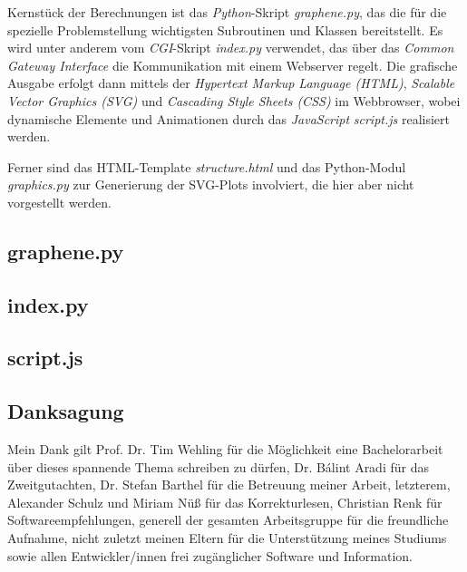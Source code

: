 \documentclass[a4paper, 10pt, twoside, openany]{book} %
\begin{document}
	Kernstück der Berechnungen ist das \emph{Python}-Skript \emph{graphene.py}, das die für die spezielle Problemstellung wichtigsten Subroutinen und Klassen bereitstellt. Es wird unter anderem vom \emph{CGI}-Skript \emph{index.py} verwendet, das über das \emph{Common Gateway Interface} die Kommunikation mit einem Webserver regelt. Die grafische Ausgabe erfolgt dann mittels der \emph{Hypertext Markup Language (HTML)}, \emph{Scalable Vector Graphics (SVG)} und \emph{Cascading Style Sheets (CSS)} im Webbrowser, wobei dynamische Elemente und Animationen durch das \emph{JavaScript} \emph{script.js} realisiert werden.
	
	Ferner sind das HTML-Template \emph{structure.html} und das Python-Modul \emph{graphics.py} zur Generierung der SVG-Plots involviert, die hier aber nicht vorgestellt werden.
	
	\section{graphene.py}
	
	
	
	\section{index.py}
	
	
	
	\section{script.js}
	
	
	
	\backmatter
	
	\vspace*{2cm}
	
	\begin{center}
		\begin{minipage}{0.67\textwidth}
			\chapter{Danksagung}
	
			Mein Dank gilt Prof. Dr. Tim Wehling für die Möglichkeit eine Bachelorarbeit über dieses spannende Thema schreiben zu dürfen, Dr. Bálint Aradi für das Zweitgutachten, Dr. Stefan Barthel für die Betreuung meiner Arbeit, letzterem, Alexander Schulz und Miriam Nüß für das Korrekturlesen, Christian Renk für Softwareempfehlungen, generell der gesamten Arbeitsgruppe für die freundliche Aufnahme, nicht zuletzt meinen Eltern für die Unterstützung meines Studiums sowie allen Entwickler/innen frei zugänglicher Software und Information.
		\end{minipage}
	\end{center}
	
\end{document}
